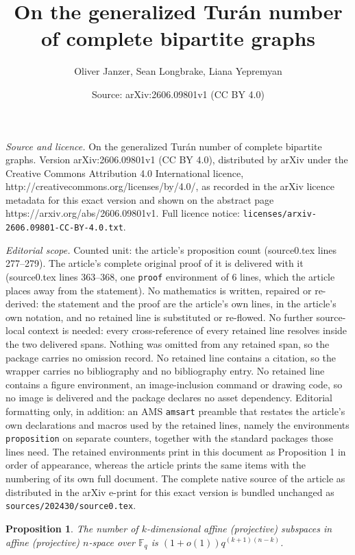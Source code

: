 \documentclass[10pt,a4paper]{amsart}
\title{On the generalized Tur\'an number of complete bipartite graphs}
\author{Oliver Janzer, Sean Longbrake, Liana Yepremyan}
\date{Source: arXiv:2606.09801v1 (CC BY 4.0)}
\newtheorem{proposition}{Proposition}
\begin{document}
\maketitle

\noindent\emph{Source and licence.} On the generalized Tur\'an number of complete bipartite graphs. Version arXiv:2606.09801v1 (CC BY 4.0), distributed by arXiv under the Creative Commons Attribution 4.0 International licence, http://creativecommons.org/licenses/by/4.0/, as recorded in the arXiv licence metadata for this exact version and shown on the abstract page https://arxiv.org/abs/2606.09801v1. Full licence notice: \texttt{licenses/arxiv-2606.09801-CC-BY-4.0.txt}.\par\smallskip

\noindent\textit{Editorial scope.} Counted unit: the article's proposition count (source0.tex lines 277--279). The article's complete original proof of it is delivered with it (source0.tex lines 363--368, one \texttt{proof} environment of 6 lines, which the article places away from the statement). No mathematics is written, repaired or re-derived: the statement and the proof are the article's own lines, in the article's own notation, and no retained line is substituted or re-flowed.  No further source-local context is needed: every cross-reference of every retained line resolves inside the two delivered spans.  Nothing was omitted from any retained span, so the package carries no omission record.  No retained line contains a citation, so the wrapper carries no bibliography and no bibliography entry.  No retained line contains a figure environment, an image-inclusion command or drawing code, so no image is delivered and the package declares no asset dependency.  Editorial formatting only, in addition: an AMS \texttt{amsart} preamble that restates the article's own declarations and macros used by the retained lines, namely the environments \texttt{proposition} on separate counters, together with the standard packages those lines need.  The retained environments print in this document as Proposition 1 in order of appearance, whereas the article prints the same items with the numbering of its own full document.  The complete native source of the article as distributed in the arXiv e-print for this exact version is bundled unchanged as \texttt{sources/202430/source0.tex}.
\begin{proposition} \label{prop:subspace count}
    The number of $k$-dimensional affine (projective) subspaces in affine (projective) $n$-space over $\mathbb{F}_q$ is $(1 +o(1))q^{(k + 1)(n - k)}$.
\end{proposition}
\end{document}
